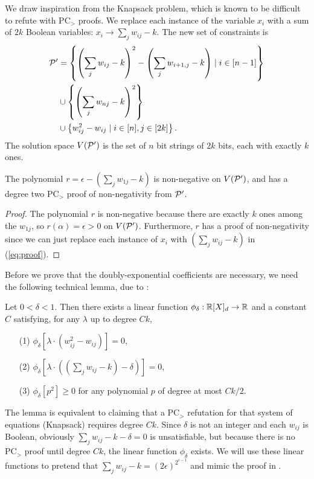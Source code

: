 We draw inspiration from the Knapsack problem, which is known to be difficult to refute with PC$_>$ proofs. We replace each instance of the variable $x_i$ with a sum of $2k$ Boolean variables: $x_i \rightarrow \sum_j w_{ij} - k$. The new set of constraints is
\begin{align*}
\mathcal P' &= \left\{\left(\sum_j w_{ij} - k\right)^2 - \left(\sum_j w_{i+1,j} - k\right) \mid i \in [n-1]\right\} \\
&\cup \left\{\left(\sum_j w_{nj} - k\right)^2 \right\} \\
&\cup \left\{w_{ij}^2 - w_{ij} \mid i \in [n], j \in [2k]\right\}.
\end{align*}
The solution space $V(\mathcal P')$ is the set of $n$ bit strings of $2k$ bits, each with exactly $k$ ones.
\begin{lemma}\label{lem:boolean-degtwoproof}
The polynomial $r = \epsilon - \left(\sum_j w_{1j} - k\right)$ is non-negative on $V(\mathcal P')$, and has a degree two PC$_>$ proof of non-negativity from $\mathcal P'$.
\end{lemma}
\begin{proof}
The polynomial $r$ is non-negative because there are exactly $k$ ones among the $w_{1j}$, so $r(\alpha) = \epsilon > 0$ on $V(\mathcal P')$.
Furthermore, $r$ has a proof of non-negativity since we can just replace each instance of $x_i$ with $\left(\sum_j w_{ij} - k\right)$ in (\ref{eq:proof}). 
\end{proof}

Before we prove that the doubly-exponential coefficients are necessary, we need the following technical lemma, due to \cite{Gri01b}:
\begin{lemma}\label{lem:knapsack-pd}
Let $0 < \delta < 1$. Then there exists a linear function $\phi_\delta: \mathbb R[X]_d \rightarrow \mathbb R$ and a constant $C$ satisfying, for any $\lambda$ up to degree $Ck$,
\begin{enumerate}
\item[(1)] $\phi_\delta[\lambda\cdot(w_{ij}^2 - w_{ij})] = 0$,
\item[(2)] $\phi_\delta[\lambda\cdot((\sum_j w_{ij} - k) - \delta)] = 0$,
\item[(3)] $\phi_\delta[p^2] \geq 0$ for any polynomial $p$ of degree at most $Ck/2$.
\end{enumerate}
\end{lemma}
The lemma is equivalent to claiming that a PC$_>$ refutation for that system of equations (Knapsack) requires degree $Ck$. Since $\delta$ is not an integer and each $w_{ij}$ is Boolean, obviously $\sum_j w_{ij} - k - \delta = 0$ is unsatisfiable, but because there is no PC$_>$ proof until degree $Ck$, the linear function $\phi_\delta$ exists. We will use these linear functions to pretend that $\sum_j w_{ij} - k = (2\epsilon)^{2^{i-1}}$ and mimic the proof in .

